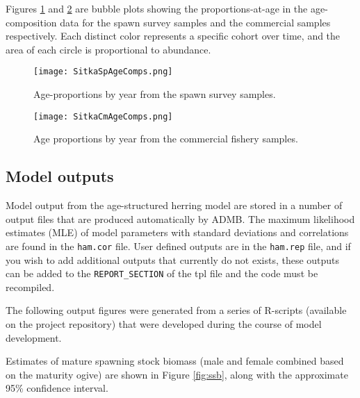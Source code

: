 \documentclass[12pt,letterpaper]{article}
\begin{document}
  Figures \ref{fig:SitkaSpAgeComps} and \ref{fig:SitkaCmAgeComps} are bubble plots showing the proportions-at-age in the age-composition data for the spawn survey samples and the commercial samples respectively. Each distinct color represents a specific cohort over time, and the area of each circle is proportional to abundance.

  \begin{figure}[tb]
    \centering
    \texttt{[image: SitkaSpAgeComps.png]}
    \caption{Age-proportions by year from the spawn survey samples.}
    \label{fig:SitkaSpAgeComps}
  \end{figure}  

  \begin{figure}[tb]
    \centering
    \texttt{[image: SitkaCmAgeComps.png]}
    \caption{Age proportions by year from the commercial fishery samples.}
    \label{fig:SitkaCmAgeComps}
  \end{figure}

  \clearpage














  \subsection{Model outputs} %
  \label{sub:model_outputs}

  Model output from the age-structured herring model are stored in a number of output files that are produced automatically by ADMB. The maximum likelihood estimates (MLE) of model parameters with standard deviations and correlations are found in the \texttt{ham.cor} file. User defined outputs are in the \texttt{ham.rep} file, and if you wish to add additional outputs that currently do not exists, these outputs can be added to the \texttt{REPORT\_SECTION} of the tpl file and the code must be recompiled.  

  The following output figures were generated from a series of R-scripts (available on the project repository) that were developed during the course of model development.

  Estimates of mature spawning stock biomass (male and female combined based on the maturity ogive) are shown in Figure \ref{fig:ssb}, along with the approximate 95\% confidence interval.
\end{document}
